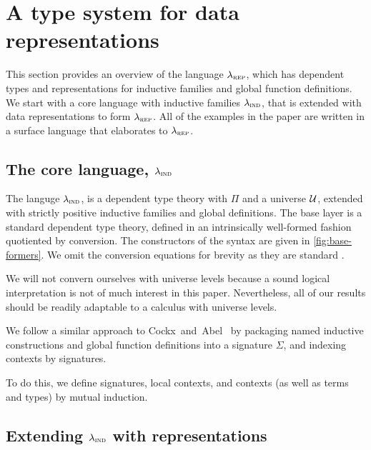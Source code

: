 \section{A type system for data representations}\label{sec:type-system}

This section provides an overview of the language $\lambda_{\textsc{rep}}$, which has
dependent types and representations for inductive families and global function
definitions. We start with a core language with inductive families $\lambda_{\textsc{ind}}$,
that is extended with data representations to form $\lambda_{\textsc{rep}}$. All of the
examples in the paper are written in a surface language that elaborates to
$\lambda_{\textsc{rep}}$.

\subsection{The core language, $\lambda_{\textsc{ind}}$}

The languge $\lambda_{\textsc{ind}}$, is a dependent type theory with $\Pi$ and a universe
$\mathcal{U}$, extended with strictly positive inductive families and global
definitions. The base layer is a standard dependent type theory, defined in an
intrinsically well-formed fashion quotiented by conversion. The constructors of
the syntax are given in \cref{fig:base-formers}. We omit the conversion
equations for brevity as they are standard \cite{Altenkirch2016-zc}.

We will not convern ourselves with universe levels because a sound logical
interpretation is not of much interest in this paper. Nevertheless, all of our
results should be readily adaptable to a calculus with universe levels.

We follow a similar approach to Cockx~and~Abel~\cite{Cockx2018-fk}
by packaging named inductive constructions and global function definitions into
a signature $\Sigma$, and indexing contexts by signatures.

To do this, we define signatures, local contexts, and contexts (as well as terms
and types) by mutual induction.

\newcommand{\ValidCase}{\mta{ValidCase}}

\subsection{Extending $\lambda_{\textsc{ind}}$ with representations}\label{sub:lambdarep}

